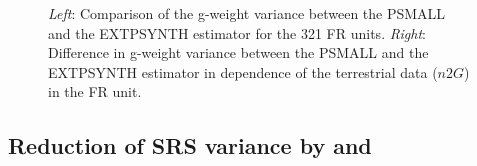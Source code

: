 


\begin{figure}[H]
	\centering
	\caption{\textit{Left}: Comparison of the g-weight variance between the PSMALL and the EXTPSYNTH estimator for the 321 FR units.
		\textit{Right}: Difference in g-weight variance between the PSMALL and the EXTPSYNTH estimator in dependence of the terrestrial data ($n2G$) in the FR unit.}
	\label{fig:compvar}
\end{figure}




\subsection{Reduction of SRS variance by \psmall{} and \extpsynth{}}
\label{sec:gain_eval}

